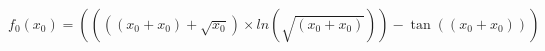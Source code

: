 \documentclass{article}
\begin{document}
\begin{equation}
f_0(x_0)=\left(\left(\left(\left(x_0 + x_0\right) +  \sqrt{x_0 }\right) \times ln( \sqrt{\left(x_0 + x_0\right) })\right) -  \tan(\left(x_0 + x_0\right) )\right)
\end{equation}
\end{document}
